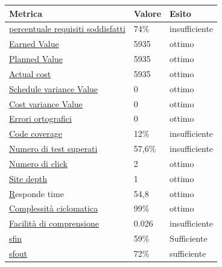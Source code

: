     \begin{longtabu} to \textwidth {| X[0.2,c m] | X[0.1,c m] | X[0.1,c m] |}
        \hline
        \textbf{Metrica} &
        \textbf{Valore} &
        \textbf{Esito}\\
        \hline
        \hyperlink{subsubsection.5.1.1}{percentuale requisiti soddisfatti}& 74\% & insufficiente \\ 
        \hline
        \hyperlink{subsubsection.5.1.2}{Earned Value} & 5935 & ottimo  \\ 
        \hline
        \hyperlink{subsubsection.5.1.2}{Planned Value} & 5935 & ottimo  \\
        \hline
        \hyperlink{subsubsection.5.1.2}{Actual cost} & 5935 & ottimo  \\
        \hline
        \hyperlink{subsubsection.5.1.2}{Schedule variance Value} & 0 & ottimo  \\
        \hline
        \hyperlink{subsubsection.5.1.2}{Cost variance Value} & 0 & ottimo  \\
        \hline
        \hyperlink{subsubsection.5.2.1}{Errori ortografici} & 0 & ottimo  \\
        \hline
        \hyperlink{subsubsection.5.2.4}{Code coverage} & 12\% & insufficiente \\
        \hline
        \hyperlink{subsubsection.5.2.5}{Numero di test superati} & 57,6\% & insufficiente \\
        \hline
        \hyperlink{subsubsection.5.3.1}{Numero di click} & 2 & ottimo \\
        \hline
        \hyperlink{subsubsection.5.3.2}{Site depth} & 1 & ottimo \\
        \hline
        \hyperlink{subsubsection.5.3.3}Responde time & 54,8 & ottimo \\
        \hline
        \hyperlink{subsubsection.5.3.4}{Complessità ciclomatica} & 99\% & ottimo \\
        \hline
        \hyperlink{subsubsection.5.3.5}{Facilità di comprensione} & 0.026 & insufficiente \\
        \hline
        \hyperlink{subsubsection.5.3.6}{sfin} & 59\% & Sufficiente \\
        \hline
        \hyperlink{subsubsection.5.3.6}{sfout} & 72\% & sufficiente \\
        \hline
        
        \end{longtabu}

